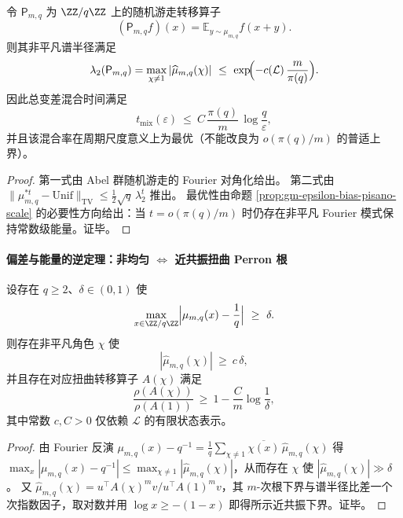\begin{proposition}\label{prop:gm-random-walk-mixing-pisano}
令 \(\mathsf{P}_{m,q}\) 为 \(\ZZ/q\ZZ\) 上的随机游走转移算子
\[
(\mathsf{P}_{m,q}f)(x)=\mathbb{E}_{y\sim\mu_{m,q}}f(x+y).
\]
则其非平凡谱半径满足
\[
\lambda_2(\mathsf{P}_{m,q})=\max_{\chi\neq 1}|\widehat\mu_{m,q}(\chi)|
\ \le\ \exp\!\Bigl(-c(\mathcal{L})\,\frac{m}{\pi(q)}\Bigr).
\]
因此总变差混合时间满足
\[
t_{\mathrm{mix}}(\varepsilon)\ \le\ C\,\frac{\pi(q)}{m}\,\log\!\frac{q}{\varepsilon},
\]
并且该混合率在周期尺度意义上为最优（不能改良为 \(o(\pi(q)/m)\) 的普适上界）。
\end{proposition}

\begin{proof}
第一式由 Abel 群随机游走的 Fourier 对角化给出。
第二式由 \(\|\mu_{m,q}^{\ast t}-\mathrm{Unif}\|_{\mathrm{TV}}\le \tfrac12\sqrt{q}\,\lambda_2^t\) 推出。
最优性由命题 \ref{prop:gm-epsilon-bias-pisano-scale} 的必要性方向给出：当 \(t=o(\pi(q)/m)\) 时仍存在非平凡 Fourier 模式保持常数级能量。证毕。
\end{proof}

\paragraph{偏差与能量的逆定理：非均匀 \texorpdfstring{$\Leftrightarrow$}{<->} 近共振扭曲 Perron 根}
\begin{proposition}[模偏差的逆定理：偏差下界 \texorpdfstring{$\Rightarrow$}{=>} 近共振扭曲 Perron 根]\label{prop:gm-mod-bias-inverse-near-resonance}
设存在 \(q\ge 2\)、\(\delta\in(0,1)\) 使
\[
\max_{x\in\ZZ/q\ZZ}\Bigl|\mu_{m,q}(x)-\frac1q\Bigr|\ \ge\ \delta.
\]
则存在非平凡角色 \(\chi\) 使
\[
|\widehat\mu_{m,q}(\chi)|\ \ge\ c\,\delta,
\]
并且存在对应扭曲转移算子 \(A(\chi)\) 满足
\[
\frac{\rho(A(\chi))}{\rho(A(1))}
\ \ge\
1-\frac{C}{m}\log\!\frac{1}{\delta},
\]
其中常数 \(c,C>0\) 仅依赖 \(\mathcal{L}\) 的有限状态表示。
\end{proposition}

\begin{proof}
由 Fourier 反演
\(
\mu_{m,q}(x)-q^{-1}=\frac{1}{q}\sum_{\chi\ne 1}\overline{\chi(x)}\,\widehat\mu_{m,q}(\chi)
\)
得 \(\max_x|\mu_{m,q}(x)-q^{-1}|\le \max_{\chi\ne 1}|\widehat\mu_{m,q}(\chi)|\)，从而存在 \(\chi\) 使 \(|\widehat\mu_{m,q}(\chi)|\gg \delta\)。
又 \(\widehat\mu_{m,q}(\chi)=u^\top A(\chi)^m v/u^\top A(1)^m v\)，其 \(m\)-次根下界与谱半径比差一个次指数因子，取对数并用 \(\log x\ge - (1-x)\) 即得所示近共振下界。证毕。
\end{proof}

